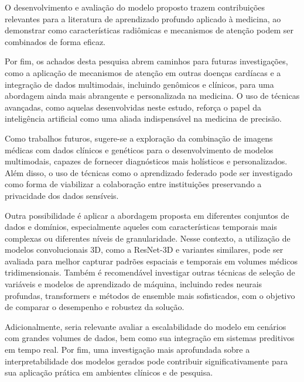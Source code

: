 O desenvolvimento e avaliação do modelo proposto trazem contribuições relevantes para a literatura de aprendizado profundo aplicado à medicina, ao demonstrar como características radiômicas e mecanismos de atenção podem ser combinados de forma eficaz. 

Por fim, os achados desta pesquisa abrem caminhos para futuras investigações, como a aplicação de mecanismos de atenção em outras doenças cardíacas e a integração de dados multimodais, incluindo genômicos e clínicos, para uma abordagem ainda mais abrangente e personalizada na medicina. O uso de técnicas avançadas, como aquelas desenvolvidas neste estudo, reforça o papel da inteligência artificial como uma aliada indispensável na medicina de precisão.



Como trabalhos futuros, sugere-se a exploração da combinação de imagens médicas com dados clínicos e genéticos para o desenvolvimento de modelos multimodais, capazes de fornecer diagnósticos mais holísticos e personalizados. Além disso, o uso de técnicas como o aprendizado federado pode ser investigado como forma de viabilizar a colaboração entre instituições preservando a privacidade dos dados sensíveis.

Outra possibilidade é aplicar a abordagem proposta em diferentes conjuntos de dados e domínios, especialmente aqueles com características temporais mais complexas ou diferentes níveis de granularidade. Nesse contexto, a utilização de modelos convolucionais 3D, como a ResNet-3D e variantes similares, pode ser avaliada para melhor capturar padrões espaciais e temporais em volumes médicos tridimensionais. Também é recomendável investigar outras técnicas de seleção de variáveis e modelos de aprendizado de máquina, incluindo redes neurais profundas, transformers e métodos de ensemble mais sofisticados, com o objetivo de comparar o desempenho e robustez da solução.

Adicionalmente, seria relevante avaliar a escalabilidade do modelo em cenários com grandes volumes de dados, bem como sua integração em sistemas preditivos em tempo real. Por fim, uma investigação mais aprofundada sobre a interpretabilidade dos modelos gerados pode contribuir significativamente para sua aplicação prática em ambientes clínicos e de pesquisa.







